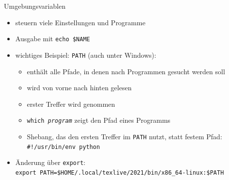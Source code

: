 \begin{frame}{Umgebungsvariablen}
  \begin{itemize}
    \item steuern viele Einstellungen und Programme
    \item Ausgabe mit \texttt{echo \$NAME}
    \item wichtiges Beispiel: \texttt{PATH} (auch unter Windows):
      \begin{itemize}
        \item enthält alle Pfade, in denen nach Programmen gesucht werden soll
        \item wird von vorne nach hinten gelesen
        \item erster Treffer wird genommen
        \item \texttt{which \textit{program}} zeigt den Pfad eines Programms
        \item Shebang, das den ersten Treffer im \texttt{PATH} nutzt, statt festem Pfad: \texttt{\#!/usr/bin/env python}
      \end{itemize}
    \item Änderung über \texttt{export}:\\
      \texttt{export PATH=\$HOME/.local/texlive/2021/bin/x86\_64-linux:\$PATH}
  \end{itemize} 
\end{frame}

